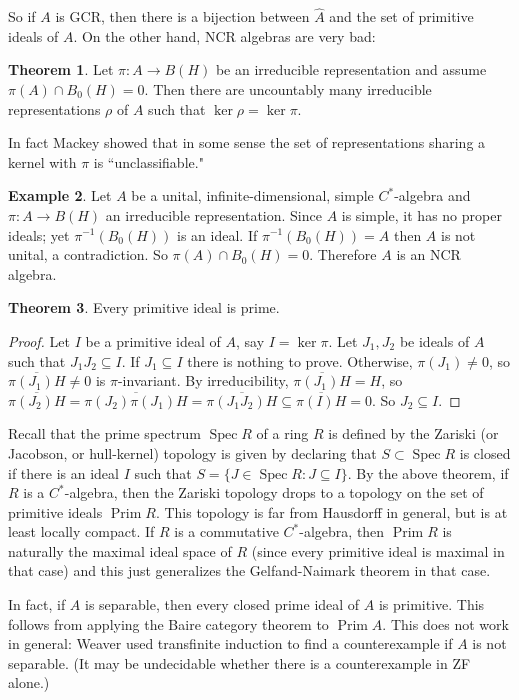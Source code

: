 \documentclass[12pt]{report}
\newcommand{\Prim}{\operatorname{Prim}}
\newcommand{\Spec}{\operatorname{Spec}}
\theoremstyle{definition}
\newtheorem{theorem}{Theorem}[chapter]
\newtheorem{example}[theorem]{Example}
\begin{document}
    So if $A$ is GCR, then there is a bijection between $\hat A$ and the set of primitive ideals of $A$. On the other hand, NCR algebras are very bad:
\begin{theorem}
    Let $\pi: A \to B(H)$ be an irreducible representation and assume $\pi(A) \cap B_0(H) = 0$. Then there are uncountably many irreducible representations $\rho$ of $A$ such that $\ker \rho = \ker \pi$.
\end{theorem}
    In fact Mackey showed that in some sense the set of representations sharing a kernel with $\pi$ is ``unclassifiable."
\begin{example}
    Let $A$ be a unital, infinite-dimensional, simple $C^*$-algebra and $\pi: A \to B(H)$ an irreducible representation. Since $A$ is simple, it has no proper ideals; yet $\pi^{-1}(B_0(H))$ is an ideal. If $\pi^{-1}(B_0(H)) = A$ then $A$ is not unital, a contradiction. So $\pi(A) \cap B_0(H) = 0$. Therefore $A$ is an NCR algebra.
\end{example}
\begin{theorem}
    Every primitive ideal is prime.
\end{theorem}
\begin{proof}
    Let $I$ be a primitive ideal of $A$, say $I = \ker \pi$. Let $J_1,J_2$ be ideals of $A$ such that $J_1J_2 \subseteq I$. If $J_1 \subseteq I$ there is nothing to prove. Otherwise, $\pi(J_1) \neq 0$, so $\overline{\pi(J_1)H} \neq 0$ is $\pi$-invariant. By irreducibility, $\overline{\pi(J_1)H} = H$, so $\overline{\pi(J_2)H} = \overline{\pi(J_2)\pi(J_1)H} = \overline{\pi(J_1J_2)H} \subseteq \overline{\pi(I)H} = 0$. So $J_2 \subseteq I$.
\end{proof}
    Recall that the prime spectrum $\Spec R$ of a ring $R$ is defined by the Zariski (or Jacobson, or hull-kernel) topology is given by declaring that $S \subset \Spec R$ is closed if there is an ideal $I$ such that $S = \{J \in \Spec R: J \subseteq I\}$. By the above theorem, if $R$ is a $C^*$-algebra, then the Zariski topology drops to a topology on the set of primitive ideals $\Prim R$. This topology is far from Hausdorff in general, but is at least locally compact. If $R$ is a commutative $C^*$-algebra, then $\Prim R$ is naturally the maximal ideal space of $R$ (since every primitive ideal is maximal in that case) and this just generalizes the Gelfand-Naimark theorem in that case.

    In fact, if $A$ is separable, then every closed prime ideal of $A$ is primitive. This follows from applying the Baire category theorem to $\Prim A$. This does not work in general: Weaver used transfinite induction to find a counterexample if $A$ is not separable. (It may be undecidable whether there is a counterexample in ZF alone.)
\end{document}
